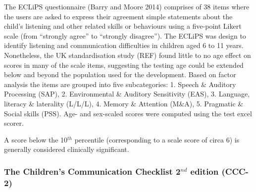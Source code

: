 \documentclass[a4paper,nobind]{templates/ociamthesis}
\begin{document}
The ECLiPS questionnaire (Barry and Moore 2014) comprises of 38 items
where the users are asked to express their agreement simple statements
about the child's listening and other related skills or behaviours using
a five-point Likert scale (from ``strongly agree'' to ``strongly
disagree''). The ECLiPS was design to identify listening and
communication difficulties in children aged 6 to 11 years. Nonetheless,
the UK standardisation study (REF) found little to no age effect on
scores in many of the scale items, suggesting the testing age could be
extended below and beyond the population used for the development. Based
on factor analysis the items are grouped into five subcategories: 1.
Speech \& Auditory Processing (SAP), 2. Environmental \& Auditory
Sensitivity (EAS), 3. Language, literacy \& laterality (L/L/L), 4.
Memory \& Attention (M\&A), 5. Pragmatic \& Social skills (PSS). Age-
and sex-scaled scores were computed using the test excel scorer.

A score below the 10\(^{th}\) percentile (corresponding to a scale score
of circa 6) is generally considered clinically significant.

\hypertarget{the-childrens-communication-checklist-2nd-edition-ccc-2}{%
\subsubsection*{\texorpdfstring{The Children's Communication Checklist
2\(^{nd}\) edition
(CCC-2)}{The Children's Communication Checklist 2\^{}\{nd\} edition (CCC-2)}}\label{the-childrens-communication-checklist-2nd-edition-ccc-2}}
\end{document}
